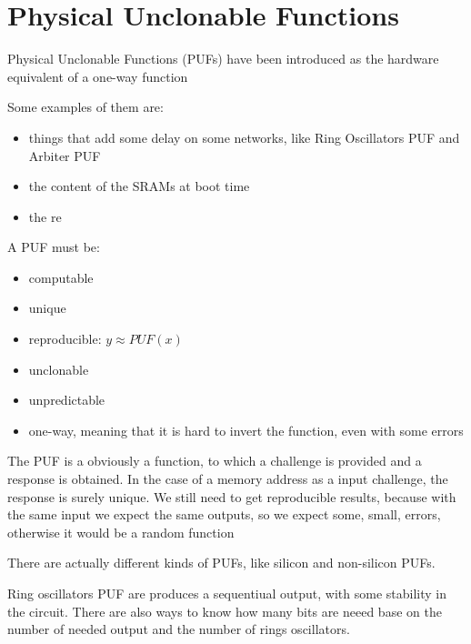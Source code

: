 \chapter{Physical Unclonable Functions}
\label{sec:PUF}

\begin{boxH}
  Physical Unclonable Functions (PUFs) have been introduced as the hardware equivalent of a one-way
  function
\end{boxH}

Some examples of them are:
\begin{itemize}
  \item things that add some delay on some networks, like Ring Oscillators PUF and Arbiter PUF
  \item the content of the SRAMs at boot time
  \item the re
\end{itemize}

A PUF must be:
\begin{itemize}
  \item computable
  \item unique
  \item reproducible: $y\approx PUF(x)$
  \item unclonable 
  \item unpredictable
  \item one-way, meaning that it is hard to invert the function, even with some errors
\end{itemize}

The PUF is a obviously a function, to which a challenge is provided and a response is obtained. In
the case of a memory address as a input challenge, the response is surely unique.
We still need to get reproducible results, because with the same input we expect the same outputs,
so we expect some, small, errors, otherwise it would be a random function

There are actually different kinds of PUFs, like silicon and non-silicon PUFs. 

Ring oscillators PUF are produces a sequentiual output, with some stability in the circuit.
There are also ways to know how many bits are neeed base on the number of needed output and the
number of rings oscillators.
